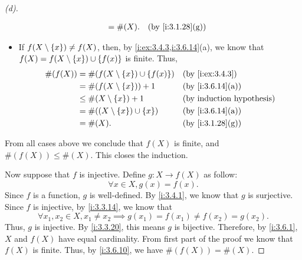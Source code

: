 \begin{proof}[(d)]
\begin{itemize}
\begin{align*}
                     & = \#(X).                                 &  & \by{i:3.1.28}[g]
          \end{align*}
    \item If \(f(X \setminus \left\lbrace x\right\rbrace) \neq f(X)\), then, by \cref{i:ex:3.4.3,i:3.6.14}(a), we know that \(f(X) = f(X \setminus \left\lbrace x\right\rbrace) \cup \left\lbrace f(x)\right\rbrace\) is finite.
          Thus,
          \begin{align*}
            \#(f(X)) & = \#(f(X \setminus \set{x}) \cup \set{f(x)}) &  & \by{i:ex:3.4.3}  \\
                     & = \#(f(X \setminus \set{x})) + 1             &  & \by{i:3.6.14}[a] \\
                     & \leq \#(X \setminus \set{x}) + 1             &  & \byIH            \\
                     & = \#((X \setminus \set{x}) \cup \set{x})     &  & \by{i:3.6.14}[a] \\
                     & = \#(X).                                     &  & \by{i:3.1.28}[g]
          \end{align*}
  \end{itemize}
  From all cases above we conclude that \(f(X)\) is finite, and \(\#(f(X)) \leq \#(X)\).
  This closes the induction.

  Now suppose that \(f\) is injective.
  Define \(g : X \to f(X)\) as follow:
  \[
    \forall x \in X, g(x) = f(x).
  \]
  Since \(f\) is a function, \(g\) is well-defined.
  By \cref{i:3.4.1}, we know that \(g\) is surjective.
  Since \(f\) is injective, by \cref{i:3.3.14}, we know that
  \[
    \forall x_1, x_2 \in X, x_1 \neq x_2 \implies g(x_1) = f(x_1) \neq f(x_2) = g(x_2).
  \]
  Thus, \(g\) is injective.
  By \cref{i:3.3.20}, this means \(g\) is bijective.
  Therefore, by \cref{i:3.6.1}, \(X\) and \(f(X)\) have equal cardinality.
  From first part of the proof we know that \(f(X)\) is finite.
  Thus, by \cref{i:3.6.10}, we have \(\#(f(X)) = \#(X)\).
\end{proof}

